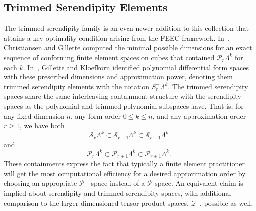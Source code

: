 \documentclass[format=acmsmall,screen,timestamp=false,a4paper]{acmart}
\newcommand{\calP}{\mathcal{P}}
\newcommand{\calQ}{\mathcal{Q}}
\newcommand{\calS}{\mathcal{S}}
\begin{document}
 
 
    
\subsection{Trimmed Serendipity Elements}
    The trimmed serendipity family is an even newer addition to this collection that attains a key optimality condition arising from the FEEC framework.
	In~\cite{christiansen2016constructions}, Christiansen and Gillette computed the minimal possible dimensions for an exact sequence of conforming finite element spaces on cubes that contained $\calP_r\Lambda^k$ for each $k$.
	In~\cite{gillette2019trimmed}, Gillette and Kloefkorn identified polynomial differential form spaces with these prescribed dimensions and approximation power, denoting them trimmed serendipity elements with the notation $S^-_r\Lambda^k$.  
	The trimmed serendipity spaces share the same interleaving containment structure with the serendipity spaces as the polynomial and trimmed polynomial subspaces have.  That is, for any fixed dimension $n$, any form order $0\leq k\leq n$, and any approximation order $r\geq 1$, we have both
\begin{equation*}
      \calS_r \Lambda^k \subset \calS^-_{r+1} \Lambda^k \subset \calS_{r+1} \Lambda^k
  \end{equation*}
  and   
   \begin{equation*}
      \calP_r \Lambda^k \subset \calP^-_{r+1} \Lambda^k \subset \calP_{r+1} \Lambda^k.
  \end{equation*}
	These containments express the fact that typically a finite element practitioner will get the most computational efficiency for a desired approximation order by choosing an appropriate $\calP^-$ space instead of a $\calP$ space.
	An equivalent claim is implied about serendipity and trimmed serendipity spaces, with additional comparison to the larger dimensioned tensor product spaces, $\calQ^-$, possible as well.


    
    
  
\end{document}
